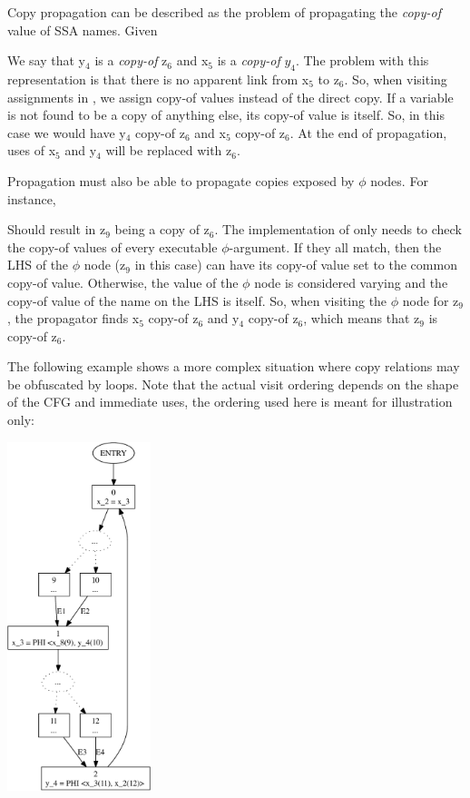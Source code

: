 Copy propagation can be described as the problem of propagating
the \textit{copy-of} value of SSA names.  Given

\begin{center}
\parbox{1in}{}
\end{center}

We say that y$_4$ is a \textit{copy-of} z$_6$ and x$_5$ is a
\textit{copy-of} $y_4$.  The problem with this representation is
that there is no apparent link from x$_5$ to z$_6$.  So, when
visiting assignments in , we assign
copy-of values instead of the direct copy.  If a variable is not
found to be a copy of anything else, its copy-of value is itself.
So, in this case we would have y$_4$ copy-of z$_6$ and x$_5$
copy-of z$_6$.  At the end of propagation, uses of x$_5$ and y$_4$
will be replaced with z$_6$.


Propagation must also be able to propagate copies exposed by
$\phi$ nodes.  For instance,

\begin{center}
\parbox{2in}{}
\end{center}

Should result in z$_9$ being a copy of z$_6$.  The implementation
of  only needs to check the copy-of
values of every executable $\phi$-argument.  If they all match,
then the LHS of the $\phi$ node (z$_9$ in this case) can have its
copy-of value set to the common copy-of value.  Otherwise, the
value of the $\phi$ node is considered varying and the copy-of
value of the name on the LHS is itself.  So, when visiting the
$\phi$ node for z$_9$, the propagator finds x$_5$ copy-of z$_6$
and y$_4$ copy-of z$_6$, which means that z$_9$ is copy-of z$_6$.

The following example shows a more complex situation where copy
relations may be obfuscated by loops.  Note that the actual visit
ordering depends on the shape of the CFG and immediate uses, the
ordering used here is meant for illustration only:

\begin{center}
\parbox{2in}{\includegraphics[height=4in]{copy-prop-3}}
\end{center}

